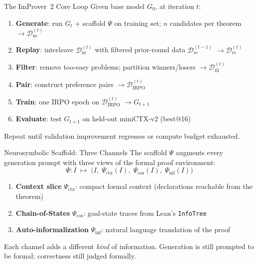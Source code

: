 \begin{frame}{The ImProver~2 Core Loop}
\vspace{0.3em}
Given base model $G_0$, at iteration $t$:
\vspace{0.2em}
\begin{enumerate}\setlength{\itemsep}{6pt}
  \item \textbf{Generate}: run $G_t$ + scaffold $\Psi$ on training set; $n$ candidates per theorem $\to \mathcal{D}^{(t)}_{\mathrm{nr}}$
  \item \textbf{Replay}: interleave $\mathcal{D}^{(t)}_{\mathrm{nr}}$ with filtered prior-round data $\mathcal{D}^{(t-1)}_{\mathrm{re}}$ $\to \mathcal{D}^{(t)}_{\mathrm{re}}$
  \item \textbf{Filter}: remove too-easy problems; partition winners/losers $\to \mathcal{D}^{(t)}_{\mathrm{fil}}$
  \item \textbf{Pair}: construct preference pairs $\to \mathcal{D}^{(t)}_{\mathrm{IRPO}}$
  \item \textbf{Train}: one IRPO epoch on $\mathcal{D}^{(t)}_{\mathrm{IRPO}}$ $\to G_{t+1}$
  \item \textbf{Evaluate}: test $G_{t+1}$ on held-out miniCTX-v2 (best@16)
\end{enumerate}
\vspace{0.3em}
\small Repeat until validation improvement regresses or compute budget exhausted.
\end{frame}

\begin{frame}{Neurosymbolic Scaffold: Three Channels}
\vspace{0.4em}
The scaffold $\Psi$ augments every generation prompt with three views of the formal proof environment:
\[
  \Psi: I \;\mapsto\; \bigl(I,\; \Psi_{\mathrm{ctx}}(I),\; \Psi_{\mathrm{cos}}(I),\; \Psi_{\mathrm{inf}}(I)\bigr)
\]
\vspace{0.3em}
\begin{enumerate}\setlength{\itemsep}{8pt}
  \item \textbf{Context slice} $\Psi_{\mathrm{ctx}}$: compact formal context (declarations reachable from the theorem)
  \item \textbf{Chain-of-States} $\Psi_{\mathrm{cos}}$: goal-state traces from Lean's \texttt{InfoTree}
  \item \textbf{Auto-informalization} $\Psi_{\mathrm{inf}}$: natural language translation of the proof
\end{enumerate}
\vspace{0.4em}
\small Each channel adds a different \emph{kind} of information. Generation is still prompted to be formal; correctness still judged formally.
\end{frame}

